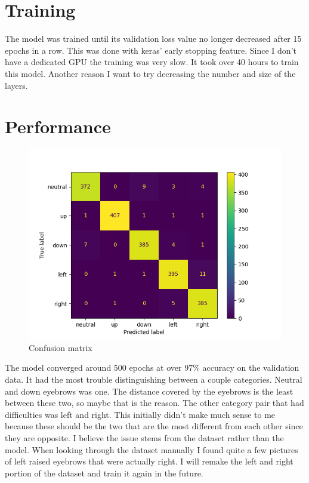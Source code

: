 \documentclass[11pt]{scrartcl} %
\begin{document}
\section{Training}
The model was trained until its validation loss value no longer decreased after 15 epochs in a row. 
This was done with keras' early stopping feature. Since I don't have a dedicated GPU the training was very slow. 
It took over 40 hours to train this model. Another reason I want to try decreasing the number and size of the layers.

\section{Performance}

\begin{figure}[ht!] %
	\centering
	\includegraphics[width=0.8\columnwidth]{figures/confusionMatrix_RGB.png} 
	\caption{Confusion matrix}
\end{figure}

The model converged around 500 epochs at over 97\% accuracy on the validation data. It had the most trouble distinguishing between a couple categories. 
Neutral and down eyebrows was one. 
The distance covered by the eyebrows is the least between these two, so maybe that is the reason.
The other category pair that had difficulties was left and right.
This initially didn't make much sense to me because these should be the two that are the most different from each other since they are opposite. I believe the issue stems from the dataset rather than the model. 
When looking through the dataset manually I found quite a few pictures of left raised eyebrows that were actually right. 
I will remake the left and right portion of the dataset and train it again in the future.
\clearpage
\end{document}
